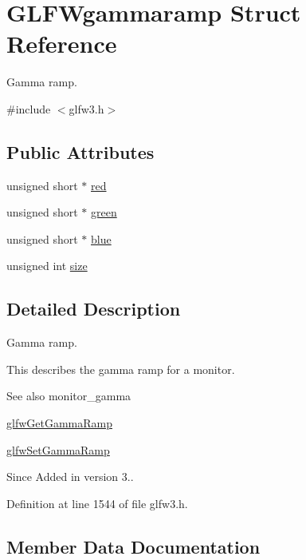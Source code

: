 \hypertarget{struct_g_l_f_wgammaramp}{}\section{G\+L\+F\+Wgammaramp Struct Reference}
\label{struct_g_l_f_wgammaramp}


Gamma ramp.  




{\ttfamily \#include $<$glfw3.\+h$>$}

\subsection*{Public Attributes}
\begin{DoxyCompactItemize}
\item 
unsigned short $\ast$ \mbox{\hyperlink{struct_g_l_f_wgammaramp_a2cce5d968734b685623eef913e635138}{red}}
\item 
unsigned short $\ast$ \mbox{\hyperlink{struct_g_l_f_wgammaramp_affccc6f5df47820b6562d709da3a5a3a}{green}}
\item 
unsigned short $\ast$ \mbox{\hyperlink{struct_g_l_f_wgammaramp_acf0c836d0efe29c392fe8d1a1042744b}{blue}}
\item 
unsigned int \mbox{\hyperlink{struct_g_l_f_wgammaramp_ad620e1cffbff9a32c51bca46301b59a5}{size}}
\end{DoxyCompactItemize}


\subsection{Detailed Description}
Gamma ramp. 

This describes the gamma ramp for a monitor.

\begin{DoxySeeAlso}{See also}
monitor\+\_\+gamma 

\mbox{\hyperlink{group__monitor_gaeeac9198f3c91b83440eed679441f76b}{glfw\+Get\+Gamma\+Ramp}} 

\mbox{\hyperlink{group__monitor_gac9f36a1cfa10eab191d3029ea8bc9558}{glfw\+Set\+Gamma\+Ramp}}
\end{DoxySeeAlso}
\begin{DoxySince}{Since}
Added in version 3.. 
\end{DoxySince}


Definition at line 1544 of file glfw3.\+h.



\subsection{Member Data Documentation}
\mbox{\label{struct_g_l_f_wgammaramp_acf0c836d0efe29c392fe8d1a1042744b}} 
